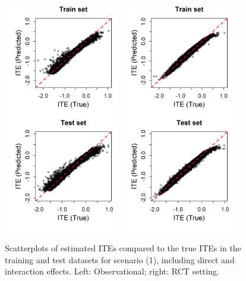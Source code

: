 \begin{figure}[htbp]
\centering
\includegraphics[width=0.45\textwidth]{img/results/observ_scenario1_ITE_scatter_train_test.png}
\includegraphics[width=0.45\textwidth]{img/results/rct_scenario1_ITE_scatter_train_test.png}
\caption{Scatterplots of estimated ITEs compared to the true ITEs in the training and test datasets for scenario (1), including direct and interaction effects. Left: Observational; right: RCT setting.}
\label{fig:scenario1_ite_scatter_train_test}
\end{figure}




